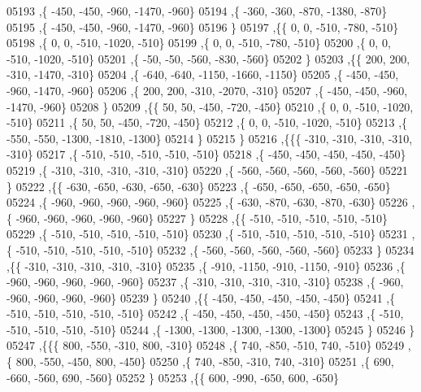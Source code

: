\begin{DoxyCode}
05193     ,\{  -450,  -450,  -960, -1470,  -960\}
05194     ,\{  -360,  -360,  -870, -1380,  -870\}
05195     ,\{  -450,  -450,  -960, -1470,  -960\}
05196     \}
05197    ,\{\{     0,     0,  -510,  -780,  -510\}
05198     ,\{     0,     0,  -510, -1020,  -510\}
05199     ,\{     0,     0,  -510,  -780,  -510\}
05200     ,\{     0,     0,  -510, -1020,  -510\}
05201     ,\{   -50,   -50,  -560,  -830,  -560\}
05202     \}
05203    ,\{\{   200,   200,  -310, -1470,  -310\}
05204     ,\{  -640,  -640, -1150, -1660, -1150\}
05205     ,\{  -450,  -450,  -960, -1470,  -960\}
05206     ,\{   200,   200,  -310, -2070,  -310\}
05207     ,\{  -450,  -450,  -960, -1470,  -960\}
05208     \}
05209    ,\{\{    50,    50,  -450,  -720,  -450\}
05210     ,\{     0,     0,  -510, -1020,  -510\}
05211     ,\{    50,    50,  -450,  -720,  -450\}
05212     ,\{     0,     0,  -510, -1020,  -510\}
05213     ,\{  -550,  -550, -1300, -1810, -1300\}
05214     \}
05215    \}
05216   ,\{\{\{  -310,  -310,  -310,  -310,  -310\}
05217     ,\{  -510,  -510,  -510,  -510,  -510\}
05218     ,\{  -450,  -450,  -450,  -450,  -450\}
05219     ,\{  -310,  -310,  -310,  -310,  -310\}
05220     ,\{  -560,  -560,  -560,  -560,  -560\}
05221     \}
05222    ,\{\{  -630,  -650,  -630,  -650,  -630\}
05223     ,\{  -650,  -650,  -650,  -650,  -650\}
05224     ,\{  -960,  -960,  -960,  -960,  -960\}
05225     ,\{  -630,  -870,  -630,  -870,  -630\}
05226     ,\{  -960,  -960,  -960,  -960,  -960\}
05227     \}
05228    ,\{\{  -510,  -510,  -510,  -510,  -510\}
05229     ,\{  -510,  -510,  -510,  -510,  -510\}
05230     ,\{  -510,  -510,  -510,  -510,  -510\}
05231     ,\{  -510,  -510,  -510,  -510,  -510\}
05232     ,\{  -560,  -560,  -560,  -560,  -560\}
05233     \}
05234    ,\{\{  -310,  -310,  -310,  -310,  -310\}
05235     ,\{  -910, -1150,  -910, -1150,  -910\}
05236     ,\{  -960,  -960,  -960,  -960,  -960\}
05237     ,\{  -310,  -310,  -310,  -310,  -310\}
05238     ,\{  -960,  -960,  -960,  -960,  -960\}
05239     \}
05240    ,\{\{  -450,  -450,  -450,  -450,  -450\}
05241     ,\{  -510,  -510,  -510,  -510,  -510\}
05242     ,\{  -450,  -450,  -450,  -450,  -450\}
05243     ,\{  -510,  -510,  -510,  -510,  -510\}
05244     ,\{ -1300, -1300, -1300, -1300, -1300\}
05245     \}
05246    \}
05247   ,\{\{\{   800,  -550,  -310,   800,  -310\}
05248     ,\{   740,  -850,  -510,   740,  -510\}
05249     ,\{   800,  -550,  -450,   800,  -450\}
05250     ,\{   740,  -850,  -310,   740,  -310\}
05251     ,\{   690,  -660,  -560,   690,  -560\}
05252     \}
05253    ,\{\{   600,  -990,  -650,   600,  -650\}

\end{DoxyCode}
